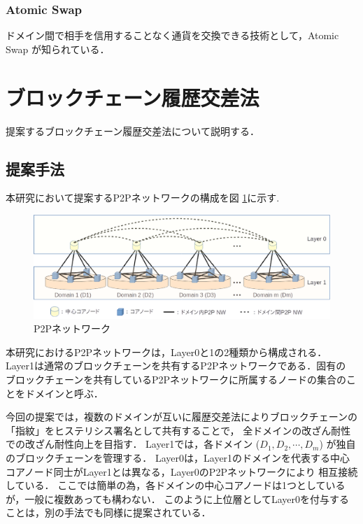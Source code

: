 \documentclass[a4paper,12pt]{jsarticle}
\begin{document}
      \subsubsection{Atomic Swap}
ドメイン間で相手を信用することなく通貨を交換できる技術として，Atomic Swap \cite{atomicswap}
が知られている．

\newpage
\section{ブロックチェーン履歴交差法}
提案するブロックチェーン履歴交差法について説明する．
  \subsection{提案手法}
\label{teian}

本研究において提案するP2Pネットワークの構成を図 \ref{fig:p2p}に示す. 
%
%
\begin{figure}[H]%
  \begin{center}
    \includegraphics[width=130mm]{pht/p2p_network_image_r1.eps}
  \end{center}
  \caption{P2Pネットワーク}
  \label{fig:p2p}
\end{figure}


本研究におけるP2Pネットワークは，Layer0と1の2種類から構成される．
Layer1は通常のブロックチェーンを共有するP2Pネットワークである．固有の
ブロックチェーンを共有しているP2Pネットワークに所属するノードの集合のことをドメインと呼ぶ．

今回の提案では，複数のドメインが互いに履歴交差法によりブロックチェーンの「指紋」をヒステリシス署名として共有することで，
全ドメインの改ざん耐性での改ざん耐性向上を目指す．
Layer1では，各ドメイン ($D_1, D_2, \cdots, D_m$) が独自のブロックチェーンを管理する．
Layer0は，Layer1のドメインを代表する中心コアノード同士がLayer1とは異なる，Layer0のP2Pネットワークにより
相互接続している．
ここでは簡単の為，各ドメインの中心コアノードは1つとしているが，一般に複数あっても構わない．
このように上位層としてLayer0を付与することは，別の手法でも同様に提案されている\cite{bloX}．
\end{document}
